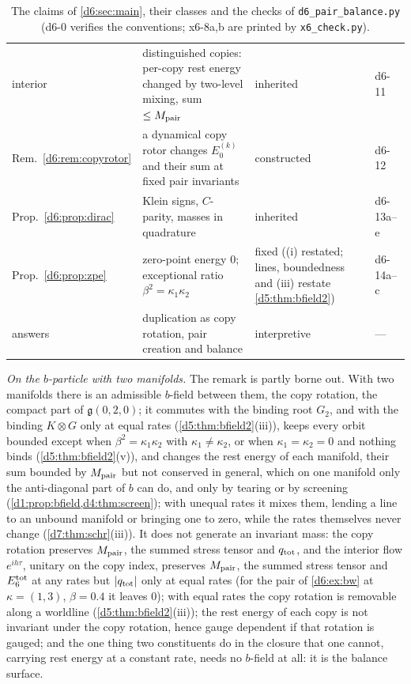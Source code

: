 \begin{table}[t]
\begin{tabular}{@{}>{\raggedright\arraybackslash}p{2.7cm}>{\raggedright\arraybackslash}p{7.2cm}>{\raggedright\arraybackslash}p{3.2cm}>{\raggedright\arraybackslash}p{1.4cm}@{}}
interior & distinguished copies: per-copy rest energy changed by two-level mixing, sum $\le M_{\rm pair}$ & inherited & d6-11\\
Rem.~\ref{d6:rem:copyrotor} & a dynamical copy rotor changes $E_0^{(k)}$ and their sum at fixed pair invariants & constructed & d6-12\\
Prop.~\ref{d6:prop:dirac} & Klein signs, $C$-parity, masses in quadrature & inherited & d6-13a--e\\
Prop.~\ref{d6:prop:zpe} & zero-point energy $0$; exceptional ratio $\beta^2=\kappa_1\kappa_2$ & fixed ((i) restated; lines, boundedness and (iii) restate \cref{d5:thm:bfield2}) & d6-14a--c\\
answers & duplication as copy rotation, pair creation and balance & interpretive & ---\\
\bottomrule
\end{tabular}
\caption{The claims of \cref{d6:sec:main}, their classes and the checks of \texttt{d6\_pair\_balance.py} (d6-0 verifies the conventions; x6-8a,b are printed by \texttt{x6\_check.py}).}
\label{d6:tab:claims}
\end{table}

\emph{On the $b$-particle with two manifolds.} The remark is partly borne out. With two manifolds there is an admissible $b$-field between
them, the copy rotation, the compact part of $\mathfrak g(0,2,0)$; it commutes with the binding root $G_2$, and with the binding $K\otimes G$ only at equal rates (\cref{d5:thm:bfield2}(iii)), keeps every orbit bounded except when
$\beta^2=\kappa_1\kappa_2$ with $\kappa_1\neq\kappa_2$, or when $\kappa_1=\kappa_2=0$ and nothing binds (\cref{d5:thm:bfield2}(v)), and changes the rest energy of each manifold, their sum bounded by $M_{\rm pair}$ but not conserved in general, which on one manifold only the anti-diagonal part of $b$
can do, and only by tearing or by screening (\cref{d1:prop:bfield,d4:thm:screen}); with unequal rates it mixes them, lending a line to an unbound
manifold or bringing one to zero, while the rates themselves never change (\cref{d7:thm:schr}(iii)). It does not generate an invariant mass: the copy rotation preserves $M_{\rm pair}$, the summed stress tensor and $q_{\rm tot}$, and the
interior flow $e^{ih\tau}$, unitary on the copy index, preserves $M_{\rm pair}$, the summed stress tensor and $E_6^{\rm tot}$ at any rates but
$|q_{\rm tot}|$ only at equal rates (for the pair of \cref{d6:ex:bw} at $\kappa=(1,3)$, $\beta=0.4$ it leaves $0$); with equal rates the copy rotation is removable along a worldline (\cref{d5:thm:bfield2}(iii)); the rest energy of each copy is not invariant under the copy rotation, hence gauge dependent if that rotation is gauged; and the one thing two constituents do in
the closure that one cannot, carrying rest energy at a constant rate, needs no $b$-field at all: it is the balance surface.

